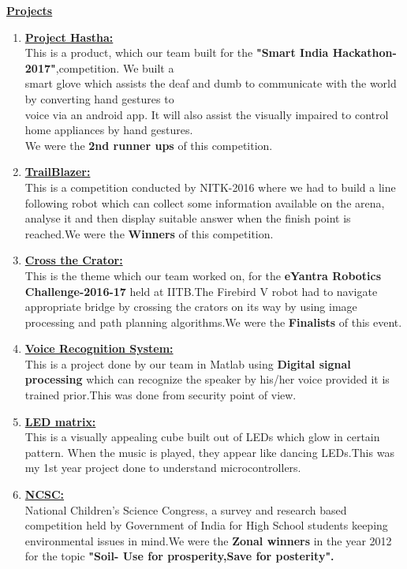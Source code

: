 \documentclass[10pt]{article}
\begin{document}
\underline{\textbf{\Large{Projects}}}
\begin{enumerate}
	\item{\underline{\textbf{\large{Project Hastha:}}}\\ 
		This is a product, which our team built for the \textbf{"Smart India Hackathon-2017"},competition. We built a\\ smart glove which assists the deaf and dumb to communicate with the world by converting hand gestures to\\ voice via an android app. It will also assist the visually impaired to control home appliances by hand gestures.\\We were the \textbf{2nd runner ups} of this competition.}
	\item{\underline{\textbf{\large{TrailBlazer:}}}\\
		This is a competition conducted by NITK-2016 where we had to build a line following robot which can collect some information available on the arena, analyse it and then display suitable answer when the finish point is reached.We were the \textbf{Winners} of this competition. }
	\item{\underline{\textbf{\large{Cross the Crator:}}}\\ This is the theme which our team worked on, for the \textbf{eYantra Robotics Challenge-2016-17} held at IITB.The Firebird V robot had to navigate appropriate bridge by crossing the crators on its way by using image processing and path planning algorithms.We were the \textbf{Finalists} of this event.  }
	\item{\underline{\textbf{\large{Voice Recognition System:}}}\\This is a project done by our team in Matlab using \textbf{Digital signal processing} which can recognize the speaker by his/her voice provided it is trained prior.This was done from security point of view. }
	\item{\underline{\textbf{\large{LED matrix:}}} \\This is a visually appealing cube built out of LEDs which glow in certain pattern. When the music is played, they appear like dancing LEDs.This was my 1st year project done to understand microcontrollers. }
	\item{\underline{\textbf{\large{NCSC:}}} \\National Children's Science Congress, a survey and research based competition held by Government of India for High School students keeping environmental issues in mind.We were the \textbf{Zonal winners} in the year 2012 for the topic \textbf{"Soil- Use for prosperity,Save for posterity".}} 
\end{enumerate}
\hfill
\end{document}
